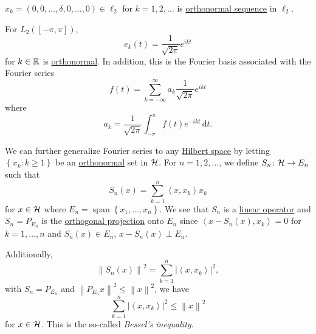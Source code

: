 \begin{eg}
	\(x_{k} = (0, 0, \ldots , \delta , 0, \ldots , 0 )\in \ell _2\) for \(k = 1, 2, \ldots  \) is \hyperref[def:orthonormal-system]{orthonormal sequence} in \(\ell _2\).
\end{eg}

\begin{eg}
	For \(L_2([-\pi , \pi ])\),
	\[
		e_k(t) = \frac{1}{\sqrt{2\pi } }e^{i k t}
	\]
	for \(k\in \mathbb{\MakeUppercase{r}} \) is \hyperref[def:orthonormal-system]{orthonormal}. In addition, this is the Fourier basis associated with the Fourier series
	\[
		f(t) = \sum_{k=-\infty }^{\infty} a_k \frac{1}{\sqrt{2\pi } }e^{ikt}
	\]
	where
	\[
		a_k = \frac{1}{\sqrt{2\pi } }\int _{-\pi}^\pi f(t) e^{-ikt}\,\mathrm{d} t.
	\]
\end{eg}

\begin{remark}
	We can further generalize Fourier series to any \hyperref[def:Hilbert-space]{Hilbert space} by letting \(\left\{ x_{k} \colon k\geq 1 \right\} \) be an \hyperref[def:orthonormal-system]{orthonormal} set in \(\mathcal{\MakeUppercase{h}} \). For \(n = 1, 2, \ldots  \), we define \(S_{n} \colon \mathcal{\MakeUppercase{h}} \to E_{n} \) such that
	\[
		S_n (x)= \sum_{k=1}^{n} \left\langle x, x_{k}  \right\rangle x_{k}
	\]
	for \(x\in \mathcal{\MakeUppercase{h}} \) where \(E_{n} = \mathop{\mathrm{span}}\left\{ x_1, \ldots , x_{n}\right\}\). We see that \(S_n\) is a \hyperref[def:linear-map]{linear operator} and \(S_n= P_{E_n}\) is the \hyperref[def:orthogonal-projection]{orthogonal projection} onto \(E_n\) since \(\left\langle x -S_n(x), x_k \right\rangle = 0\) for \(k = 1, \ldots  , n\) and \(S_{n} (x)\in E_{n}\), \(x-S_n(x)\perp E_n\).
\end{remark}

\begin{remark}\label{rmk:Bessel-ineq}
	Additionally,
	\[
		\left\lVert S_n (x)\right\rVert ^{2} = \sum_{k=1}^{n} \left\vert \left\langle x, x_{k}  \right\rangle \right\vert ^{2},
	\]
	with \(S_n = P_{E_n}\) and \(\left\lVert P_{E_n} x \right\rVert^{2} \leq \left\lVert x\right\rVert ^{2}\), we have
	\[
		\sum_{k=1}^{n} \left\vert \left\langle x, x_{k}  \right\rangle  \right\vert ^{2} \leq \left\lVert x\right\rVert ^{2}
	\]
	for \(x\in \mathcal{\MakeUppercase{h}} \). This is the so-called \emph{Bessel's inequality}.
\end{remark}


